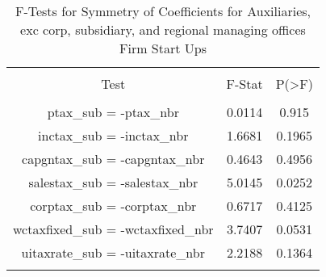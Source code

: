 
\begin{table}[!htbp] \centering 
  \caption{F-Tests for Symmetry of Coefficients for Auxiliaries, exc corp, subsidiary, and regional managing offices Firm Start Ups} 
  \label{95Ftests} 
\begin{tabular}{@{\extracolsep{5pt}} ccc} 
\\[-1.8ex]\hline 
\hline \\[-1.8ex] 
Test & F-Stat & P(\textgreater F) \\ 
\hline \\[-1.8ex] 
ptax\_sub = -ptax\_nbr & 0.0114 & 0.915 \\ 
inctax\_sub = -inctax\_nbr & 1.6681 & 0.1965 \\ 
capgntax\_sub = -capgntax\_nbr & 0.4643 & 0.4956 \\ 
salestax\_sub = -salestax\_nbr & 5.0145 & 0.0252 \\ 
corptax\_sub = -corptax\_nbr & 0.6717 & 0.4125 \\ 
wctaxfixed\_sub = -wctaxfixed\_nbr & 3.7407 & 0.0531 \\ 
uitaxrate\_sub = -uitaxrate\_nbr & 2.2188 & 0.1364 \\ 
\hline \\[-1.8ex] 
\end{tabular} 
\end{table} 
